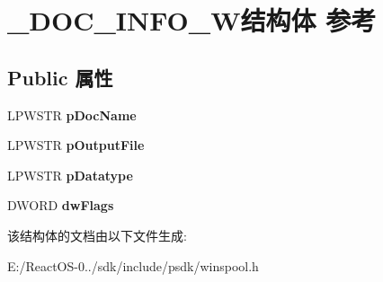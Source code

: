\hypertarget{struct___d_o_c___i_n_f_o__3_w}{}\section{\+\_\+\+D\+O\+C\+\_\+\+I\+N\+F\+O\+\_\+W结构体 参考}
\label{struct___d_o_c___i_n_f_o__3_w}
\subsection*{Public 属性}
\begin{DoxyCompactItemize}
\item 
\mbox{\label{struct___d_o_c___i_n_f_o__3_w_ae6e33f88de08f1f4662f63bb0847abc5}} 
L\+P\+W\+S\+TR {\bfseries p\+Doc\+Name}
\item 
\mbox{\label{struct___d_o_c___i_n_f_o__3_w_ac8076c1c14fd633067c45e426f255ab4}} 
L\+P\+W\+S\+TR {\bfseries p\+Output\+File}
\item 
\mbox{\label{struct___d_o_c___i_n_f_o__3_w_a5a8ff038b01f66cc32139ea4a3ec1f77}} 
L\+P\+W\+S\+TR {\bfseries p\+Datatype}
\item 
\mbox{\label{struct___d_o_c___i_n_f_o__3_w_aa225ac8596f9b4d825f44d3a5074eeda}} 
D\+W\+O\+RD {\bfseries dw\+Flags}
\end{DoxyCompactItemize}


该结构体的文档由以下文件生成\+:\begin{DoxyCompactItemize}
\item 
E\+:/\+React\+O\+S-\/0../sdk/include/psdk/winspool.\+h\end{DoxyCompactItemize}
